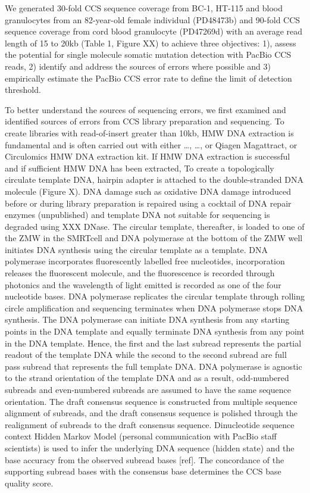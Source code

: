 We generated 30-fold CCS sequence coverage from BC-1, HT-115 and blood granulocytes from an 82-year-old female individual (PD48473b) and 90-fold CCS sequence coverage from cord blood granulocyte (PD47269d) with an average read length of 15 to 20kb (Table 1, Figure XX) to achieve three objectives: 1), assess the potential for single molecule somatic mutation detection with PacBio CCS reads, 2) identify and address the sources of errors where possible and 3) empirically estimate the PacBio CCS error rate to define the limit of detection threshold. 

To better understand the sources of sequencing errors, we first examined and identified sources of errors from CCS library preparation and sequencing. To create libraries with read-of-insert greater than 10kb, HMW DNA extraction is fundamental and is often carried out with either …, …, or Qiagen Magattract, or Circulomics HMW DNA extraction kit. If HMW DNA extraction is successful and if sufficient HMW DNA has been extracted, To create a topologically circulate template DNA, hairpin adapter is attached to the double-stranded DNA molecule (Figure X). DNA damage such as oxidative DNA damage introduced before or during library preparation is repaired using a cocktail of DNA repair enzymes (unpublished) and template DNA not suitable for sequencing is degraded using XXX DNase. The circular template, thereafter, is loaded to one of the ZMW in the SMRTcell and DNA polymerase at the bottom of the ZMW well initiates DNA synthesis using the circular template as a template. DNA polymerase incorporates fluorescently labelled free nucleotides, incorporation releases the fluorescent molecule, and the fluorescence is recorded through photonics and the wavelength of light emitted is recorded as one of the four nucleotide bases. DNA polymerase replicates the circular template through rolling circle amplification and sequencing terminates when DNA polymerase stops DNA synthesis. The DNA polymerase can initiate DNA synthesis from any starting points in the DNA template and equally terminate DNA synthesis from any point in the DNA template. Hence, the first and the last subread represents the partial readout of the template DNA while the second to the second subread are full pass subread that represents the full template DNA. DNA polymerase is agnostic to the strand orientation of the template DNA and as a result, odd-numbered subreads and even-numbered subreads are assumed to have the same sequence orientation. The draft consensus sequence is constructed from multiple sequence alignment of subreads, and the draft consensus sequence is polished through the realignment of subreads to the draft consensus sequence. Dinucleotide sequence context Hidden Markov Model (personal communication with PacBio staff scientists) is used to infer the underlying DNA sequence (hidden state) and the base accuracy from the observed subread bases [ref]. The concordance of the supporting subread bases with the consensus base determines the CCS base quality score.

